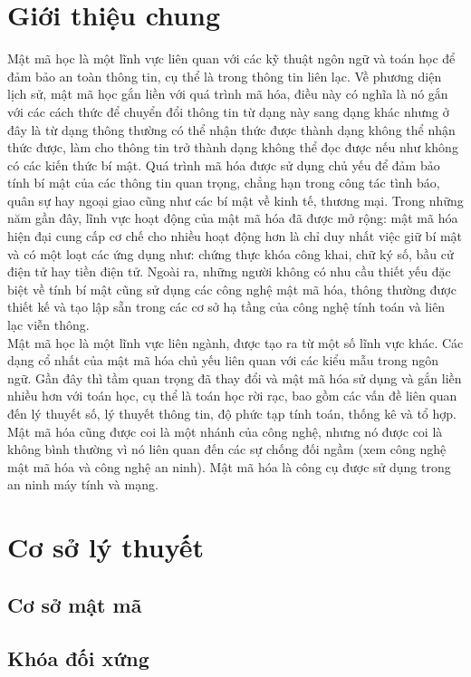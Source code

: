 \documentclass[a4paper,12pt]{report}
\begin{document}
\chapter*{Giới thiệu chung}
Mật mã học là một lĩnh vực liên quan với các kỹ thuật ngôn ngữ và toán học để đảm bảo an toàn thông tin, cụ thể là trong thông tin liên lạc. Về phương diện lịch sử, mật mã học gắn liền với quá trình mã hóa, điều này có nghĩa là nó gắn với các cách thức để chuyển đổi thông tin từ dạng này sang dạng khác nhưng ở đây là từ dạng thông thường có thể nhận thức được thành dạng không thể nhận thức được, làm cho thông tin trở thành dạng không thể đọc được nếu như không có các kiến thức bí mật. Quá trình mã hóa được sử dụng chủ yếu để đảm bảo tính bí mật của các thông tin quan trọng, chẳng hạn trong công tác tình báo, quân sự hay ngoại giao cũng như các bí mật về kinh tế, thương mại.  Trong những năm gần đây, lĩnh vực hoạt động của mật mã hóa đã được mở rộng: mật mã hóa hiện đại cung cấp cơ chế cho nhiều hoạt động hơn là chỉ duy nhất việc giữ bí mật và có một loạt các ứng dụng như: chứng thực khóa công khai, chữ ký số, bầu cử điện tử hay tiền điện tử. Ngoài ra, những người không có nhu cầu thiết yếu đặc biệt về tính bí mật cũng sử dụng các công nghệ mật mã hóa, thông thường được thiết kế và tạo lập sẵn trong các cơ sở hạ tầng của công nghệ tính toán và liên lạc viễn thông. \\

Mật mã học là một lĩnh vực liên ngành, được tạo ra từ một số lĩnh vực khác. Các dạng cổ nhất của mật mã hóa chủ yếu liên quan với các kiểu mẫu trong ngôn ngữ. Gần đây thì tầm quan trọng đã thay đổi và mật mã hóa sử dụng và gắn liền nhiều hơn với toán học, cụ thể là toán học rời rạc, bao gồm các vấn đề liên quan đến lý thuyết số, lý thuyết thông tin, độ phức tạp tính toán, thống kê và tổ hợp. Mật mã hóa cũng được coi là một nhánh của công nghệ, nhưng nó được coi là không bình thường vì nó liên quan đến các sự chống đối ngầm (xem công nghệ mật mã hóa và công nghệ an ninh). Mật mã hóa là công cụ được sử dụng trong an ninh máy tính và mạng. \\ 


\chapter{Cơ sở lý thuyết}
\section{Cơ sở mật mã}
\section{Khóa đối xứng}
\end{document}
